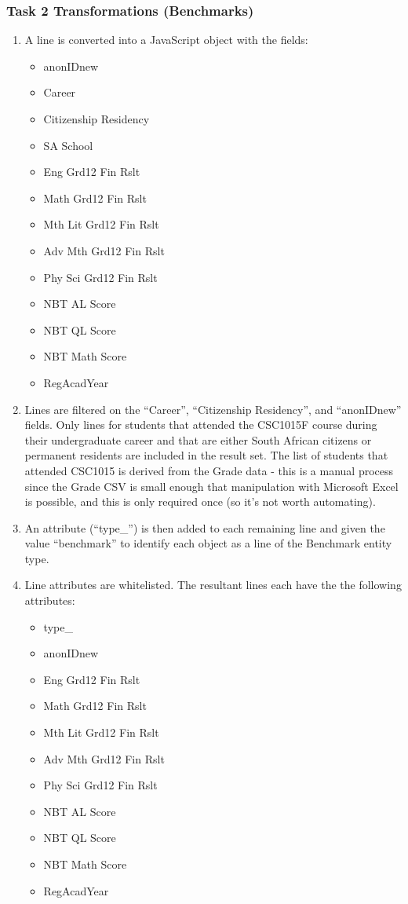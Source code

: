 \subsubsection{Task 2 Transformations (Benchmarks)}
\begin{enumerate}
  \item A line is converted into a JavaScript object with the fields:
        \begin{itemize}
          \item anonIDnew
          \item Career
          \item Citizenship Residency
          \item SA School
          \item Eng Grd12 Fin Rslt
          \item Math Grd12 Fin Rslt
          \item Mth Lit Grd12 Fin Rslt
          \item Adv Mth Grd12 Fin Rslt
          \item Phy Sci Grd12 Fin Rslt
          \item NBT AL Score
          \item NBT QL Score
          \item NBT Math Score
          \item RegAcadYear
        \end{itemize}
  \item Lines are filtered on the ``Career'', ``Citizenship Residency'', and ``anonIDnew'' fields. Only lines for students that attended the CSC1015F course during their undergraduate career and that are either South African citizens or permanent residents are included in the result set. The list of students that attended CSC1015 is derived from the Grade data - this is a manual process since the Grade CSV is small enough that manipulation with Microsoft Excel is possible, and this is only required once (so it's not worth automating).
  \item An attribute (``type\_'') is then added to each remaining line and given the value ``benchmark'' to identify each object as a line of the Benchmark entity type.
  \item Line attributes are whitelisted. The resultant lines each have the the following attributes:
        \begin{itemize}
          \item type\_
          \item anonIDnew
          \item Eng Grd12 Fin Rslt
          \item Math Grd12 Fin Rslt
          \item Mth Lit Grd12 Fin Rslt
          \item Adv Mth Grd12 Fin Rslt
          \item Phy Sci Grd12 Fin Rslt
          \item NBT AL Score
          \item NBT QL Score
          \item NBT Math Score
          \item RegAcadYear
        \end{itemize}
\end{enumerate}

